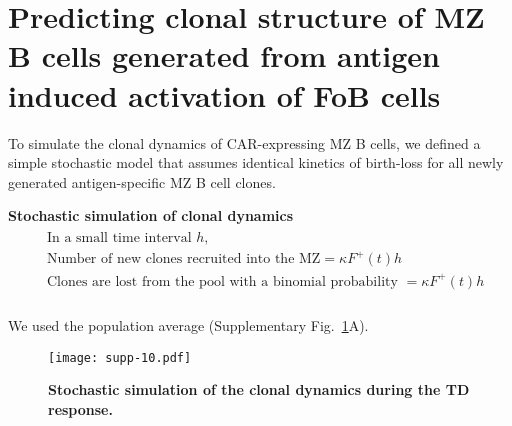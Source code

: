 \documentclass[11pt]{article}
\begin{document}
 
\clearpage


\section*{Predicting clonal structure of MZ B cells generated from antigen induced activation of FoB cells}

To simulate the clonal dynamics of CAR-expressing MZ B cells, we defined a simple stochastic model that assumes identical kinetics of birth-loss for all newly generated antigen-specific MZ B cell clones.

\textbf{Stochastic simulation of clonal dynamics} 
\begin{eqnarray*}
\begin{aligned}
&\text{In a small time interval } h, \\
&\text{Number of new clones recruited into the MZ} = \kappa  F^+(t) h \\
&\text{Clones are lost from the pool with a binomial probability } = \kappa  F^+(t) h \\
\end{aligned}
\end{eqnarray*}
  
We used the 
population average
 (Supplementary Fig.~\ref{fig:clone-dyn}A).


\clearpage



\begin{figure}[htbp]
\center
\texttt{[image: supp-10.pdf]}
\caption{
    \textbf{Stochastic simulation of the clonal dynamics during the TD response.}
    }
       \label{fig:clone-dyn}
       
 \end{figure}
\end{document}
